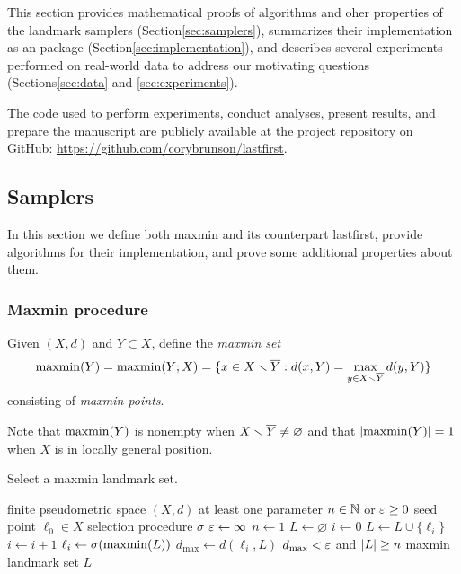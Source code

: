 \documentclass{article}
\begin{document}
\label{sec:methods}

This section provides mathematical proofs of algorithms and oher
properties of the landmark samplers (Section\nbs\ref{sec:samplers}),
summarizes their implementation as an  package
(Section\nbs\ref{sec:implementation}), and describes several experiments
performed on real-world data to address our motivating questions
(Sections\nbs\ref{sec:data} and \ref{sec:experiments}).

The  code used to perform experiments, conduct analyses, present
results, and prepare the manuscript are publicly available at the
project repository on GitHub:
\url{https://github.com/corybrunson/lastfirst}.

\hypertarget{samplers}{%
\subsection{Samplers}\label{samplers}}

\label{sec:samplers}

In this section we define both maxmin and its counterpart lastfirst,
provide algorithms for their implementation, and prove some additional
properties about them.

\hypertarget{maxmin-procedure}{%
\subsubsection{Maxmin procedure}\label{maxmin-procedure}}

\label{sec:maxmin}

\begin{definition}[maxmin]\label{def:maxmin}
    Given $(X,d)$ and $Y\subset X$, define the \emph{maxmin set}
    $$\operatorname{maxmin}(Y) = \operatorname{maxmin}(Y;X) = \{ x \in X \smallsetminus \overline{Y} : d(x,Y) = \max_{y\in X\smallsetminus \overline{Y}}{d(y,Y)} \}$$
    consisting of \emph{maxmin points}.
\end{definition}

Note that \(\operatorname{maxmin}(Y)\) is nonempty when
\(X \smallsetminus \overline{Y} \neq \varnothing\) and that \(\lvert \operatorname{maxmin}(Y)\rvert = 1\) when
\(X\) is in locally general position.

\begin{algorithm}
\caption{Select a maxmin landmark set.}
\label{alg:maxmin}
\begin{algorithmic}[1]
\REQUIRE finite pseudometric space $(X,d)$
\REQUIRE at least one parameter $n \in \mathbb{N}$ or $\varepsilon \geq 0$
\REQUIRE seed point $\ell_0 \in X$
\REQUIRE selection procedure $\sigma$
    \STATE $\varepsilon \leftarrow \infty$
\ENDIF
{}
    \STATE $n \leftarrow 1$
\ENDIF
\STATE $L \leftarrow \varnothing$
\STATE $i \leftarrow 0$
\REPEAT
    \STATE $L \leftarrow L\cup\{\ell_i\}$
    \STATE $i \leftarrow i+1$
    \STATE $\ell_i \leftarrow \sigma(\operatorname{maxmin}(L))$
    \STATE $d_{\max} \leftarrow d(\ell_i,L)$
\UNTIL $d_{\max} < \varepsilon$ and $\lvert L\rvert \geq n$
\RETURN maxmin landmark set $L$
\end{algorithmic}
\end{algorithm}
\end{document}
